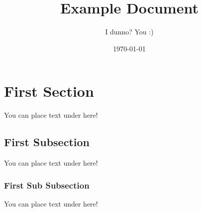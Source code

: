 \documentclass[12pt, a4paper]{article}
\title{Example Document}
\author{I dunno? You :)}
\date{\today} %
\begin{document}
	
	
	\maketitle
			
	\section{First Section}
		
		You can place text under here!
		
		\subsection{First Subsection}
			
			You can place text under here!
			
			\subsubsection{First Sub Subsection}
				
				You can place text under here!
\end{document}
